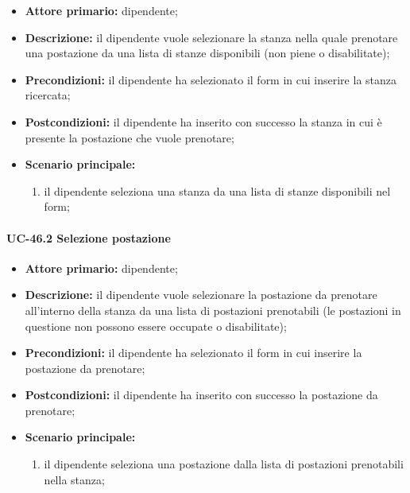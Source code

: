     \begin{itemize}
	    \item \textbf{Attore primario:} dipendente;

	    \item \textbf{Descrizione:} il dipendente vuole selezionare la stanza nella quale prenotare una postazione da una lista di stanze disponibili (non piene o disabilitate);

	    \item \textbf{Precondizioni:} il dipendente ha selezionato il form in cui inserire la stanza ricercata;

	    \item \textbf{Postcondizioni:} il dipendente ha inserito con successo la stanza in cui è presente la postazione che vuole prenotare;

	    \item \textbf{Scenario principale:}
	        \begin{enumerate}
		        \item il dipendente seleziona una stanza da una lista di stanze disponibili nel form;
	        \end{enumerate}
    \end{itemize}

\paragraph{UC-46.2 Selezione postazione}

    \begin{itemize}
        \item \textbf{Attore primario:} dipendente;

        \item \textbf{Descrizione:} il dipendente vuole selezionare la postazione da prenotare all'interno della stanza da una lista di postazioni prenotabili (le postazioni in questione non possono essere occupate o disabilitate);

        \item \textbf{Precondizioni:} il dipendente ha selezionato il form in cui inserire la postazione da prenotare;

        \item \textbf{Postcondizioni:} il dipendente ha inserito con successo la postazione da prenotare;

        \item \textbf{Scenario principale:}
            \begin{enumerate}
                \item il dipendente seleziona una postazione dalla lista di postazioni prenotabili  nella stanza;
            \end{enumerate}
    \end{itemize}

